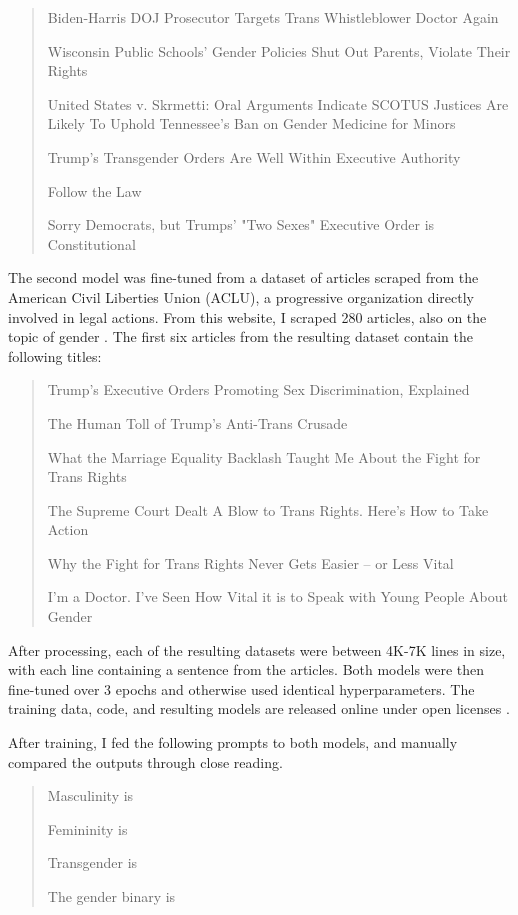 \documentclass[letterpaper]{article} %
\begin{document}
\begin{quote}
Biden-Harris DOJ Prosecutor Targets Trans Whistleblower Doctor Again

Wisconsin Public Schools' Gender Policies Shut Out Parents, Violate Their Rights

United States v. Skrmetti: Oral Arguments Indicate SCOTUS Justices Are Likely To Uphold Tennessee's Ban on Gender Medicine for Minors

Trump's Transgender Orders Are Well Within Executive Authority

Follow the Law

Sorry Democrats, but Trumps' "Two Sexes" Executive Order is Constitutional

\end{quote}

The second model was fine-tuned from a dataset of articles scraped from the American Civil Liberties Union (ACLU), a progressive organization directly involved in legal actions. From this website, I scraped 280 articles, also on the topic of gender \citep{aclu_2026}. The first six articles from the resulting dataset contain the following titles:

\begin{quote}

Trump's Executive Orders Promoting Sex Discrimination, Explained

The Human Toll of Trump's Anti-Trans Crusade

What the Marriage Equality Backlash Taught Me About the Fight for Trans Rights

The Supreme Court Dealt A Blow to Trans Rights. Here's How to Take Action

Why the Fight for Trans Rights Never Gets Easier – or Less Vital

I'm a Doctor. I've Seen How Vital it is to Speak with Young People About Gender

\end{quote}

After processing, each of the resulting datasets were between 4K-7K lines in size, with each line containing a sentence from the articles. Both models were then fine-tuned over 3 epochs and otherwise used identical hyperparameters. The training data, code, and resulting models are released online under open licenses \citep{anon}.

After training, I fed the following prompts to both models, and manually compared the outputs through close reading.

\begin{quote}

Masculinity is

Femininity is

Transgender is

The gender binary is

\end{quote}
\end{document}
